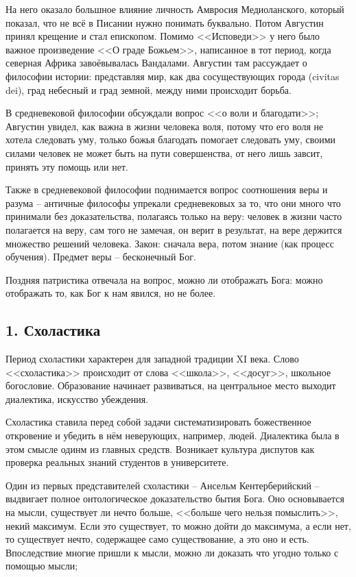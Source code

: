 \documentclass[a4paper, 12pt]{book} %
\begin{document}
На него оказало большное влияние личность Амвросия Медиоланского, который показал, что не всё в Писании нужно понимать буквально. Потом Августин принял крещение и стал епископом. Помимо <<Исповеди>> у него было важное произведение <<О граде Божьем>>, написанное в тот период, когда северная Африка завоёвывалась Вандалами. Августин там рассуждает о философии истории: представляя мир, как два сосуществующих города  (civitas dei), град небесный и град земной, между ними происходит борьба.

 В средневековой философии обсуждали вопрос <<о воли и благодати>>; Августин увидел, как важна в жизни человека воля, потому что его воля не хотела следовать уму, только божья благодать помогает следовать уму, своими силами человек не может быть на пути совершенства, от него лишь завсит, принять эту помощь или нет.
 
Также в средневековой философии поднимается вопрос соотношения веры и разума -- античные философы упрекали средневековых за то, что они много что принимали без доказательства, полагаясь только на веру: человек в жизни часто полагается на веру, сам того не замечая, он верит в результат, на вере держится множество решений человека. Закон: сначала вера, потом знание (как процесс обучения). Предмет веры -- бесконечный Бог.

Поздняя патристика отвечала на вопрос, можно ли отображать Бога: можно отображать то, как Бог к нам явился, но не более.


\subsection*{1. Схоластика}
Период схоластики характерен для западной традиции XI века.
Слово <<схоластика>> происходит от слова <<школа>>, <<досуг>>, школьное богословие. Образование начинает развиваться, на центральное место выходит диалектика, искусство убеждения.

Схоластика ставила перед собой задачи систематизировать божественное откровение и убедить в нём неверующих, например, людей. Диалектика была в этом смысле одинм из главных средств. Возникает культура диспутов как проверка реальных знаний студентов в университете.

Один из первых представителей схоластики -- Ансельм Кентерберийский -- выдвигает полное онтологическое доказательство бытия Бога. Оно основывается на мысли, существует ли нечто больше, <<больше чего нельзя помыслить>>, некий максимум. Если это существует, то можно дойти до максимума, а если нет, то существует нечто, содержащее само существование, а это оно и есть. Впоследствие многие пришли к мысли, можно ли доказать что угодно только с помощью мысли; 
\end{document}
